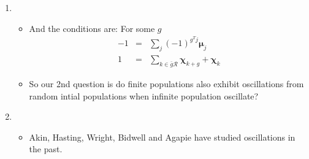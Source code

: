 \documentclass{article}
\begin{document}
\begin{enumerate}
\item
  \begin{itemize}
  \item And the conditions are: For some $g$
  \begin{eqnarray*}
      -1 &=& \sum \limits_{j} (-1)^{g^T j} \bm{\mu}_j \\
      1 &=& \sum \limits_{k \in \bar{g}\mathcal{R}} \bm{\chi}_{k+g} + \bm{\chi}_k 
      \end{eqnarray*}
  \item So our 2nd question is do finite populations also exhibit
     oscillations from random intial populations when infinite population oscillate?
  \end{itemize}
    
\item
  \begin{itemize}
    \item Akin, Hasting, Wright, Bidwell and Agapie have studied oscillations in the past.
  \end{itemize}


\end{enumerate}
\end{document}
